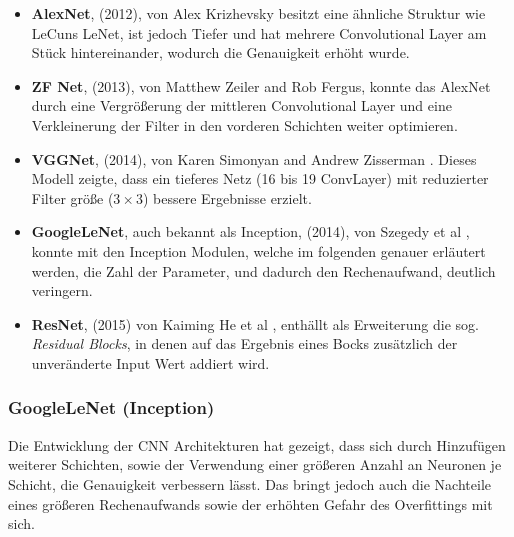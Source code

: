 \begin{itemize}
    \item \textbf{AlexNet}, (2012), von Alex Krizhevsky 
        \cite{krizhevskyImageNetClassificationDeep2017b} besitzt eine 
        ähnliche Struktur wie LeCuns LeNet, ist jedoch Tiefer und 
        hat mehrere Convolutional Layer am Stück hintereinander,
        wodurch die Genauigkeit erhöht wurde.

    \item \textbf{ZF Net}, (2013), von Matthew Zeiler and Rob Fergus,
        \cite{zeilerVisualizingUnderstandingConvolutional2013}
        konnte das AlexNet durch eine Vergrößerung der 
        mittleren Convolutional Layer und eine Verkleinerung 
        der Filter in den vorderen Schichten weiter optimieren.

    \item \textbf{VGGNet}, (2014), von Karen Simonyan and Andrew Zisserman
        \cite{simonyanVeryDeepConvolutional2015}.
        Dieses Modell zeigte, dass ein tieferes Netz (16 bis 19 ConvLayer)
        mit reduzierter Filter größe ($3\times3$) bessere Ergebnisse erzielt.    

    \item \textbf{GoogleLeNet}, auch bekannt als Inception, (2014),
        von Szegedy et al \cite{szegedyGoingDeeperConvolutions2014},
        konnte mit den Inception Modulen,
        welche im folgenden genauer erläutert werden, die Zahl der 
        Parameter, und dadurch den Rechenaufwand, deutlich veringern.

    \item \textbf{ResNet}, (2015) von Kaiming He et al 
        \cite{heDeepResidualLearning2015}, enthällt 
        als Erweiterung die sog. \textit{Residual Blocks}, in denen auf
        das Ergebnis eines Bocks zusätzlich der unveränderte
        Input Wert addiert wird.

\end{itemize}



\subsubsection{GoogleLeNet (Inception)}

Die Entwicklung der CNN Architekturen hat gezeigt, dass 
sich durch Hinzufügen weiterer Schichten, sowie
der Verwendung einer größeren Anzahl an Neuronen je Schicht, 
die Genauigkeit verbessern lässt.
Das bringt jedoch auch die Nachteile eines 
größeren Rechenaufwands sowie der erhöhten 
Gefahr des Overfittings mit sich.

